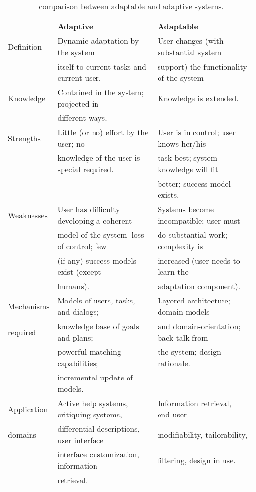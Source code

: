 \begin{table}
 \caption{~\citet{fischer_user_2001} comparison between adaptable and adaptive systems.}
 \label{tbl:fischer}
 \footnotesize
 \centering
\begin{tabular}{l l l}
  \hline
			& \textbf{Adaptive} 			& \textbf{Adaptable}\\
  \hline
	Definition	& Dynamic adaptation by the system  	& User changes (with substantial system	\\
			& itself to current tasks and current user.& support) the functionality of the system\\
	Knowledge	& Contained in the system; projected in & Knowledge is extended.		\\
			& different ways.			& ~					\\ 
	Strengths	& Little (or no) effort by the user; no & User is in control; user knows her/his\\
			& knowledge of the user is special required.& task best; system knowledge will fit \\
			& 					& better; success model exists.		\\
	Weaknesses	& User has difficulty developing a coherent& Systems become incompatible; user must\\
			& model of the system; loss of control;	few & do substantial work; complexity is \\
			& (if any) success models exist (except	& increased (user needs to learn the 	\\
			& humans).				& adaptation component). 		\\
	Mechanisms	& Models of users, tasks, and dialogs;	& Layered architecture; domain models 	\\
	required	& knowledge base of goals and plans;  	& and domain-orientation; back-talk from\\
			& powerful matching capabilities;  	& the system; design rationale.		\\
			& incremental update of models.		& ~ 					\\
	Application	& Active help systems, critiquing systems,& Information retrieval, end-user	\\
	domains		& differential descriptions, user interface& modifiability, tailorability, 	\\
			& interface customization, information	& filtering, design in use.		\\
			& retrieval.				& ~					\\
  \hline
\end{tabular}
\end{table}

